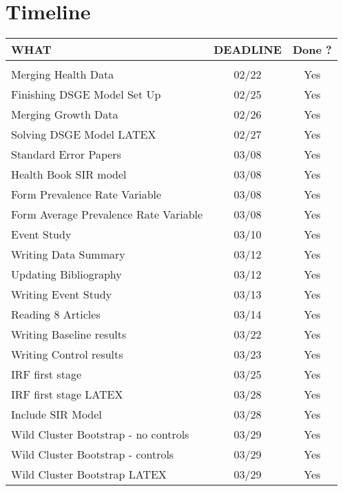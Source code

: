 \documentclass[10pt,a4paper]{article}
\begin{document}
\section*{Timeline}
\begin{center}
\begin{tabular}{l||c||c}
\hline 
\rule[-1ex]{0pt}{2.5ex} WHAT & DEADLINE & Done ?\\
\hline  \\
\rule[-1ex]{0pt}{2.5ex} Merging Health Data & 02/22  & Yes\\ 
\rule[-1ex]{0pt}{2.5ex} Finishing DSGE Model Set Up & 02/25 & Yes\\ 
\rule[-1ex]{0pt}{2.5ex} Merging Growth Data & 02/26 & Yes\\ 
\rule[-1ex]{0pt}{2.5ex} Solving DSGE Model LATEX & 02/27 & Yes\\ 
\rule[-1ex]{0pt}{2.5ex} Standard Error Papers & 03/08 & Yes\\ 
\rule[-1ex]{0pt}{2.5ex} Health Book SIR model & 03/08 & Yes\\ 
\rule[-1ex]{0pt}{2.5ex} Form Prevalence Rate Variable & 03/08 & Yes\\ 
\rule[-1ex]{0pt}{2.5ex} Form Average Prevalence Rate Variable & 03/08 & Yes\\ 
\rule[-1ex]{0pt}{2.5ex} Event Study & 03/10 & Yes\\ 
\rule[-1ex]{0pt}{2.5ex} Writing Data Summary & 03/12 & Yes\\ 
\rule[-1ex]{0pt}{2.5ex} Updating Bibliography & 03/12 & Yes\\ 
\rule[-1ex]{0pt}{2.5ex} Writing Event Study & 03/13 & Yes\\ 
\rule[-1ex]{0pt}{2.5ex} Reading 8 Articles & 03/14 & Yes\\
\rule[-1ex]{0pt}{2.5ex} Writing Baseline results & 03/22 & Yes\\ 
\rule[-1ex]{0pt}{2.5ex} Writing Control results & 03/23 & Yes\\ 
\rule[-1ex]{0pt}{2.5ex} IRF first stage & 03/25 & Yes\\ 
\rule[-1ex]{0pt}{2.5ex} IRF first stage LATEX & 03/28 & Yes\\ 
\rule[-1ex]{0pt}{2.5ex} Include SIR Model & 03/28 & Yes\\ 
\rule[-1ex]{0pt}{2.5ex} Wild Cluster Bootstrap - no controls& 03/29 & Yes\\
\rule[-1ex]{0pt}{2.5ex} Wild Cluster Bootstrap - controls& 03/29 & Yes\\
\rule[-1ex]{0pt}{2.5ex} Wild Cluster Bootstrap LATEX & 03/29 & Yes \\ 

\end{tabular}
\end{center}
\end{document}
